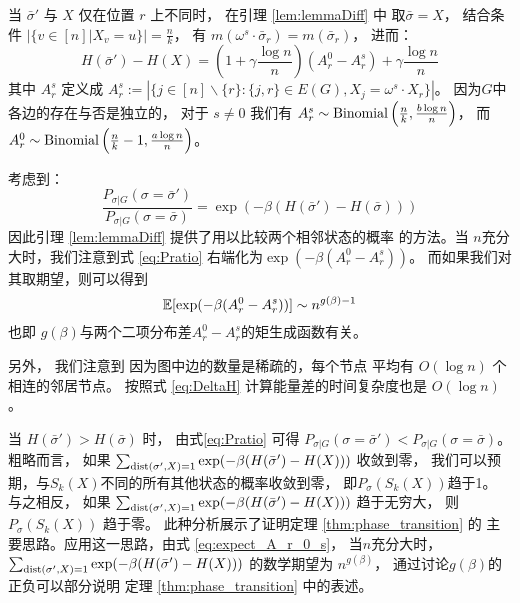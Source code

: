\begin{remark}\label{re:energy_diff}
	当 $\bar{\sigma}'$ 与 $X$ 仅在位置 $r$
	上不同时， 在引理 \ref{lem:lemmaDiff} 中
	取$\bar{\sigma}=X$，
	结合条件  $|\{v \in [n] | X_v = u\}| = \frac{n}{k}$，
	有 $m(\omega^s \cdot \bar{\sigma}_r)
	=m(\bar{\sigma}_r)$，
	进而：
	\begin{equation}\label{eq:energy_diff}
	H(\bar{\sigma}') - H(X) = \left(1+\gamma \frac{\log n}{n} \right)
	(A^0_r - A^s_r) + \gamma\frac{\log n}{n}
	\end{equation}
	其中 $A^s_r$ 定义成
	$A^s_r := |\{j \in [n]\backslash \{r\}: \{j, r\} \in E(G), X_j = \omega^s \cdot X_r \}|$。
	因为$G$中各边的存在与否是独立的，
	对于 $s\neq 0$
	我们有 $A^s_r \sim \operatorname{Binomial} \left(
	  \frac{n}{k}, \frac{b \log n}{n} \right) $，
	而 $A^0_r \sim \operatorname{Binomial}
	\left(
	  \frac{n}{k}-1, \frac{a \log n}{n} \right)$。	
\end{remark}
考虑到：
\begin{equation}\label{eq:Pratio}
\frac{P_{\sigma |G } (\sigma = \bar{\sigma}')}{P_{\sigma |G } (\sigma = \bar{\sigma})}
= \exp(-\beta(H(\bar{\sigma}') - H(\bar{\sigma})))
\end{equation}
因此引理 \ref{lem:lemmaDiff} 提供了用以比较两个相邻状态的概率
的方法。当 $n$充分大时，我们注意到式
\eqref{eq:Pratio} 右端化为$\exp(-\beta (A_r^0 - A_r^s))$。
而如果我们对其取期望，则可以得到
\begin{equation}\label{eq:expect_A_r_0_s}
	\operatorname{\mathbb{E}}[\exp(-\beta (A_r^0 - A_r^s))] \sim n^{g(\beta)-1}
\end{equation}
也即 $g(\beta)$与两个二项分布差$A_r^0 - A_r^s$的矩生成函数有关。



另外， 我们注意到 因为图中边的数量是稀疏的，每个节点
平均有 $O(\log n)$ 个相连的邻居节点。
按照式 \eqref{eq:DeltaH} 
计算能量差的时间复杂度也是 $O(\log n)$。

当 $H(\bar{\sigma}') > H(\bar{\sigma})$ 时， 
由式\eqref{eq:Pratio} 可得
$P_{\sigma | G}(\sigma = \bar{\sigma}')<P_{\sigma | G}(\sigma = \bar{\sigma})$。
粗略而言， 如果
$ \sum_{\operatorname{dist}(\sigma', X)=1}\exp(-\beta(H(\bar{\sigma}') - H(X))) $
收敛到零，
我们可以预期，与$S_k(X)$不同的所有其他状态的概率收敛到零，
即$P_{\sigma}(S_k(X))$趋于1。
与之相反， 如果
$ \sum_{\operatorname{dist}(\sigma', X)=1}\exp(-\beta(H(\bar{\sigma}') - H(X))) $
趋于无穷大，
则 $P_{\sigma}(S_k(X))$ 趋于零。
此种分析展示了证明定理 \ref{thm:phase_transition} 的
主要思路。应用这一思路，由式
\eqref{eq:expect_A_r_0_s}，
当$n$充分大时，$ \sum_{\operatorname{dist}(\sigma', X)=1}\exp(-\beta(H(\bar{\sigma}') - H(X))) $
的数学期望为 $n^{g(\beta)}$，
通过讨论$g(\beta)$的正负可以部分说明
定理 \ref{thm:phase_transition} 中的表述。
